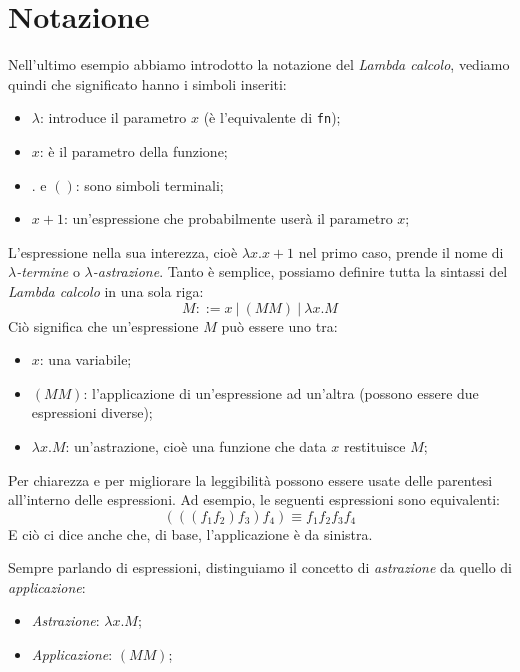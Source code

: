 \documentclass[12pt, a4paper]{report}
\theoremstyle{definition}
\newcommand{\code}[1]{\texttt{#1}}
\begin{document}
\section{Notazione}
Nell'ultimo esempio abbiamo introdotto la notazione del \emph{Lambda calcolo},
vediamo quindi che significato hanno i simboli inseriti:
\begin{itemize}
    \item $\lambda$: introduce il parametro $x$ (è l'equivalente di \code{fn});
    \item $x$: è il parametro della funzione;
    \item $.$ e $()$: sono simboli terminali;
    \item $x + 1$: un'espressione che probabilmente userà il parametro $x$;
\end{itemize}
L'espressione nella sua interezza, cioè \(\lambda x.x+1\) nel primo caso,
prende il nome di \emph{$\lambda$-termine} o \emph{$\lambda$-astrazione}.
Tanto è semplice, possiamo definire tutta la sintassi del \emph{Lambda calcolo}
in una sola riga:
\[M::= x\ |\ (MM)\ |\ \lambda x.M\]
Ciò significa che un'espressione $M$ può essere uno tra:
\begin{itemize}
    \item $x$: una variabile;
    \item $(M M)$: l'applicazione di un'espressione ad un'altra
    (possono essere due espressioni diverse);
    \item \(\lambda x.M\): un'astrazione, cioè una funzione che data $x$
    restituisce $M$;
\end{itemize}
Per chiarezza e per migliorare la leggibilità possono essere usate delle parentesi
all'interno delle espressioni. Ad esempio, le seguenti espressioni sono equivalenti:
\[(((f_1 f_2) f_3) f_4)\equiv f_1 f_2 f_3 f_4\]
E ciò ci dice anche che, di base, l'applicazione è da sinistra.

Sempre parlando di espressioni, distinguiamo il concetto di \emph{astrazione} da
quello di \emph{applicazione}:
\begin{itemize}
    \item \emph{Astrazione}: \(\lambda x.M\);
    \item \emph{Applicazione}: \((M M)\);
\end{itemize}
\end{document}
